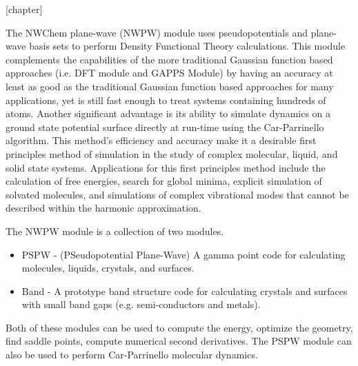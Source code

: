 \label{sec:pspw}

[chapter]
\def\thealgcounter{\thechapter.\arabic{algcounter}}
\newenvironment{algorithm}[1]
               { \refstepcounter{algcounter}
                \begin{center}
                  {\bf Algorithm} \thealgcounter: #1
                \end{center}
               \begin{center}\begin{enumerate} \begin{em}}
               {\end{em}\end{enumerate}\end{center}}


The NWChem plane-wave (NWPW) module uses pseudopotentials and
plane-wave basis sets to perform Density Functional Theory
calculations.  This module complements the capabilities of the more
traditional Gaussian function based approaches (i.e. DFT module and
GAPPS Module) by having an accuracy at least as good as the
traditional Gaussian function based approaches for many applications,
yet is still fast enough to treat systems containing hundreds of
atoms.  Another significant advantage is its ability to simulate
dynamics on a ground state potential surface directly at run-time
using the Car-Parrinello algorithm.  This method's efficiency and
accuracy make it a desirable first principles method of simulation in
the study of complex molecular, liquid, and solid state systems.
Applications for this first principles method include the calculation
of free energies, search for global minima, explicit simulation of
solvated molecules, and simulations of complex vibrational modes that
cannot be described within the harmonic  approximation.

The NWPW module is a collection of two modules.
\begin{itemize}
   \item PSPW - (PSeudopotential Plane-Wave) A gamma point code for
     calculating molecules, liquids, crystals, and  surfaces.  
   \item Band - A prototype band structure code for calculating
     crystals and surfaces with small band gaps (e.g. semi-conductors
     and metals).
\end{itemize}
Both of these modules can be used to compute the energy, optimize the
geometry, find saddle points, compute numerical second derivatives.
The PSPW module can also be used to perform Car-Parrinello molecular  dynamics.

